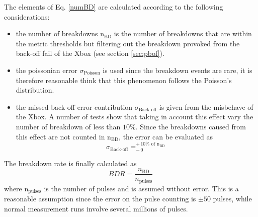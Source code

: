 The elements of Eq. \ref{numBD} are calculated according to the following considerations:
\begin{itemize}
\item the number of breakdowns n$_{\text{BD}}$ is the number of breakdowns that are within the metric thresholds but filtering out the breakdown provoked from the back-off fail of the Xbox (see section \ref{sec:pbof}).  
\item the poissonian error $\sigma_{\text{Poisson}}$ is used since the breakdown events are rare, it is therefore reasonable think that this phenomenon follows the Poisson's distribution.
\item the missed back-off error contribution $ \sigma_{\text{Back-off}}$ is given from the misbehave of the Xbox. A number of tests show that taking in account this effect vary the number of breakdown of less than $10\%$. Since the breakdowns caused from this effect are not counted in n$_{\text{BD}}$, the error can be evaluated as
\begin{equation}
\sigma_{\text{Back-off}} = _{- \, 0}^{+ \, 10\% \text{ of n}_{\text{BD}}}
\end{equation}
\end{itemize}

\noindent
The breakdown rate is finally calculated as
\begin{equation}
BDR = \frac{n_{\text{BD}}}{n_{\text{pulses}}}
\end{equation}
where n$_{\text{pulses}}$ is the number of pulses and is assumed without error. This is a reasonable assumption since the error on the pulse counting is $\pm50$ pulses, while normal measurement runs involve several millions of pulses.